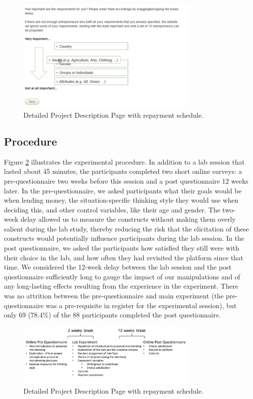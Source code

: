 \begin{figure}[h]
    \centering
    \includegraphics[width=0.8\textwidth]{graphics/Bild4.png}
    \caption{ Detailed Project Description Page with repayment schedule.}
    \label{fig:secondstep}
\end{figure}


\subsection{Procedure}
Figure \ref{fig:procedure2} illustrates the experimental
procedure. In addition to a lab session that lasted about 45 minutes, the
participants completed two short online surveys: a pre-questionnaire two weeks
before this session and a post questionnaire 12 weeks later. In the pre-questionnaire,
we asked participants what their goals would be when lending money, the
situation-specific thinking style they would use when deciding this, and other
control variables, like their age and gender. The two-week delay allowed us to
measure the constructs without making them overly salient during the lab study,
thereby reducing the risk that the elicitation of these constructs would
potentially influence participants during the lab session. In the post
questionnaire, we asked the participants how satisfied they still were with
their choice in the lab, and how often they had revisited the platform since
that time. We considered the 12-week delay between the lab session and the post
questionnaire sufficiently long to gauge the impact of our manipulations and of
any long-lasting effects resulting from the experience in the experiment. There
was no attrition between the pre-questionnaire and main experiment (the
pre-questionnaire was a pre-requisite in register for the experimental
session), but only 69 (78.4\%) of the 88 participants completed the post
questionnaire.\\
\begin{figure}[h]
    \centering
    \includegraphics[width=0.8\textwidth]{graphics/Bild5}
    \caption{ Detailed Project Description Page with repayment schedule.}
    \label{fig:procedure2}
\end{figure}
